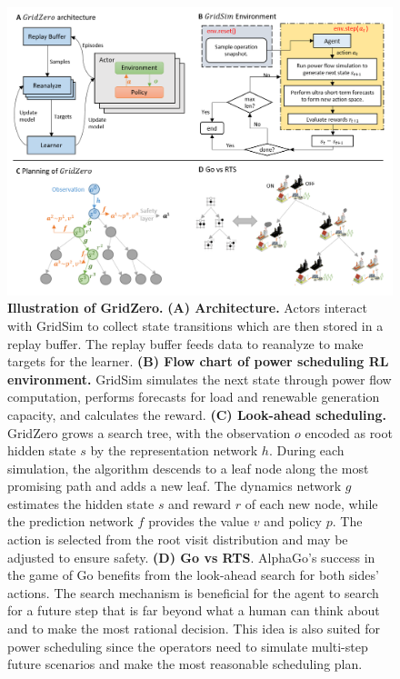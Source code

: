\begin{figure}[h]
  \centering
  \includegraphics[width=0.9\linewidth]{fig/nature_fig6.png}
  \caption{\textbf{Illustration of GridZero.}
  \textbf{(A) Architecture.}  
  Actors interact with GridSim to collect state transitions which are then stored in a replay buffer. The replay buffer feeds data to reanalyze to make targets for the learner.
  \textbf{(B) Flow chart of power scheduling RL environment.} 
  GridSim simulates the next state through power flow computation, performs forecasts for load and renewable generation capacity, and calculates the reward.
  \textbf{(C) Look-ahead scheduling.} GridZero grows a search tree, with the observation $o$ encoded as root hidden state $s$ by the representation network $h$. During each simulation, the algorithm descends to a leaf node along the most promising path and adds a new leaf. The dynamics network $g$ estimates the hidden state $s$ and reward $r$ of each new node, while the prediction network $f$ provides the value $v$ and policy $p$. The action is selected from the root visit distribution and may be adjusted to ensure safety.
  \textbf{(D) Go vs RTS}. AlphaGo's success in the game of Go benefits from the look-ahead search for both sides' actions. The search mechanism is beneficial for the agent to search for a future step that is far beyond what a human can think about and to make the most rational decision. This idea is also suited for power scheduling since the operators need to simulate multi-step future scenarios and make the most reasonable scheduling plan. 
  } 
  \label{fig:nature_fig1}
\end{figure}


